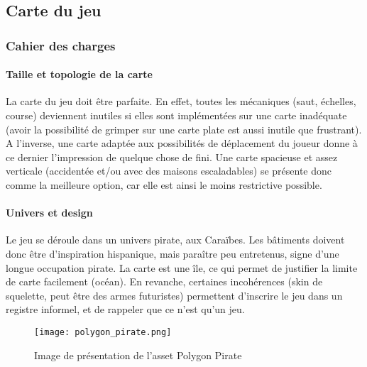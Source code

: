 \subsection{Carte du jeu}

\vspace{0.5cm}
\subsubsection{Cahier des charges}
\vspace{0.5cm}

    \paragraph{Taille et topologie de la carte}
        
        La carte du jeu doit être parfaite. En effet, toutes les mécaniques 
        (saut, échelles, course)
        deviennent inutiles si elles sont implémentées sur une carte inadéquate (avoir la 
        possibilité de grimper sur une carte plate est aussi inutile que frustrant).
        A l'inverse, une carte adaptée aux possibilités de déplacement du joueur donne à ce dernier
        l'impression de quelque chose de fini.
        Une carte spacieuse et assez verticale (accidentée et/ou avec des maisons escaladables)
        se présente donc comme la meilleure option, car elle est ainsi le moins restrictive possible.


    \paragraph{Univers et design}

        Le jeu se déroule dans un univers pirate, aux Caraïbes.
        Les bâtiments doivent donc être d'inspiration hispanique,
        mais paraître peu entretenus, signe d'une longue occupation 
        pirate. La carte est une île, ce qui permet de justifier
        la limite de carte facilement (océan). En revanche, certaines 
        incohérences (skin de squelette, peut être des armes futuristes)
        permettent d'inscrire le jeu dans un registre informel, et de 
        rappeler que ce n'est qu'un jeu.


        \begin{figure}[!hbt]
            \centering
            \texttt{[image: polygon\_pirate.png]}
            \caption{Image de présentation de l'asset Polygon Pirate}
        \end{figure}


